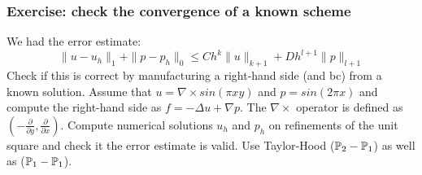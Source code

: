 \begin{frame}
\frametitle{Exercise: check the convergence of a known scheme}

We had the error estimate: 
\[
\| u - u_h \|_1 +  \| p - p_h \|_0 \leqslant C h^k \| u  \|_{k+1} +  D h^{l+1} \| p \|_{l+1}
\]
Check if this is correct by manufacturing a right-hand side (and bc) 
from a known solution. 
Assume that $u=\nabla\times sin(\pi x y)$ 
and $p= sin(2\pi x)$ and compute the right-hand side
as $f=-\Delta u + \nabla p$. 
The $\nabla\times$ operator is defined as $(-\frac{\partial}{\partial y}, \frac{\partial}{\partial x})$.
Compute numerical solutions
$u_h$ and $p_h$ on refinements of the unit square and check 
it the error estimate is valid. Use Taylor-Hood ($\mathbb{P}_2-\mathbb{P}_1$) 
as well as ($\mathbb{P}_1-\mathbb{P}_1$).   

\end{frame}
